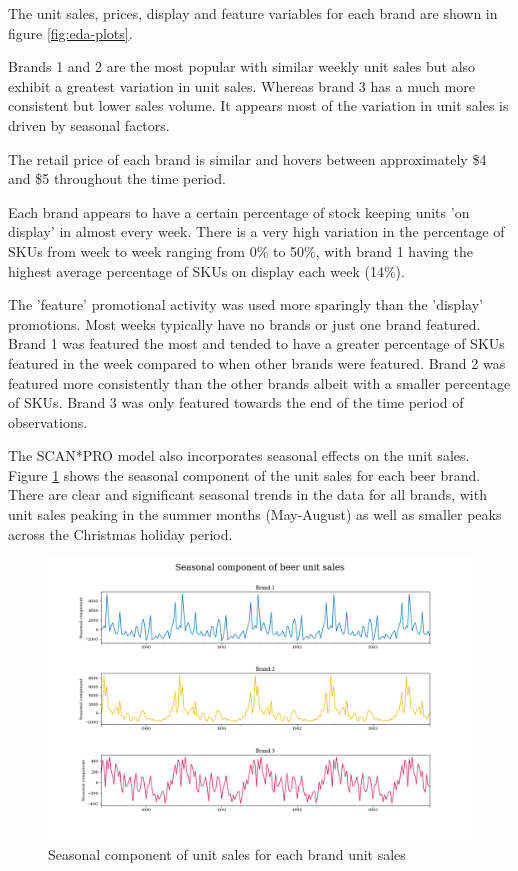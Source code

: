 \documentclass[a4paper,11pt]{article}
\begin{document}
The unit sales, prices, display and feature variables for each brand are shown in figure \ref{fig:eda-plots}. 

Brands 1 and 2 are the most popular with similar weekly unit sales but also exhibit a greatest variation in unit sales. Whereas brand 3 has a much more consistent but lower sales volume. It appears most of the variation in unit sales is driven by seasonal factors.

The retail price of each brand is similar and hovers between approximately \$4 and \$5 throughout the time period. 

Each brand appears to have a certain percentage of stock keeping units 'on display' in almost every week. There is a very high variation in the percentage of SKUs from week to week ranging from 0\% to 50\%, with brand 1 having the highest average percentage of SKUs on display each week (14\%).

The 'feature' promotional activity was used more sparingly than the 'display' promotions. Most weeks typically have no brands or just one brand featured. Brand 1 was featured the most and tended to have a greater percentage of SKUs featured in the week compared to when other brands were featured. Brand 2 was featured more consistently than the other brands albeit with a smaller percentage of SKUs. Brand 3 was only featured towards the end of the time period of observations. 

The SCAN*PRO model also incorporates seasonal effects on the unit sales. Figure \ref{fig:seasonal-plots} shows the seasonal component of the unit sales for each beer brand. There are clear and significant seasonal trends in the data for all brands, with unit sales peaking in the summer months (May-August) as well as smaller peaks across the Christmas holiday period.


\begin{figure}
  \centering
  \includegraphics[scale=0.38]{seasonal_plots}
  \caption{Seasonal component of unit sales for each brand unit sales}\label{fig:seasonal-plots}
\end{figure}
\end{document}
